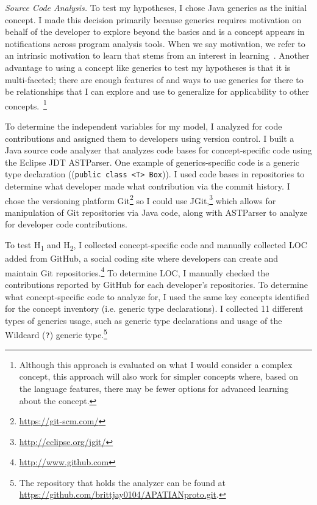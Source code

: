 \documentclass{llncs}
\begin{document}
\vspace{0.5em}
\noindent\textit{Source Code Analysis.}
To test my hypotheses, I chose Java generics as the initial concept. I made this decision primarily because generics requires motivation on behalf of the developer to explore beyond the basics and is a concept appears in notifications across program analysis tools. When we say motivation, we refer to an intrinsic motivation to learn that stems from an interest in learning~\cite{krapp1999interest,hall2008we}.		
Another advantage to using a concept like generics to test my hypotheses is that it is multi-faceted; there are enough features of and ways to use generics for there to be relationships that I can explore and use to generalize for applicability to other concepts.~\footnote{Although this approach is evaluated on what I would consider a complex concept, this approach will also work for simpler concepts where, based on the language features, there may be fewer options for advanced learning about the concept.}

To determine the independent variables for my model, I analyzed for code contributions and assigned them to developers using version control. 
I built a Java source code analyzer that analyzes code bases for concept-specific code using the Eclipse JDT ASTParser. 
One example of generics-specific code is a generic type declaration ((\texttt{public class <T> Box})).
I used code bases in repositories to determine what developer made what contribution via the commit history. 
I chose the versioning platform Git\footnote{\url{https://git-scm.com/}} so I could use JGit,\footnote{\url{http://eclipse.org/jgit/}} which allows for manipulation of Git repositories via Java code, along with ASTParser to analyze for developer code contributions.

To test H\textsubscript{1} and H\textsubscript{2}, I collected concept-specific code and manually collected LOC added from GitHub, a social coding site where developers can create and maintain Git repositories.\footnote{\url{http://www.github.com}} To determine LOC, I manually checked the contributions reported by GitHub for each developer's repositories. To determine what concept-specific code to analyze for, I used the same key concepts identified for the concept inventory (i.e. generic type declarations). I collected 11 different types of generics usage, such as generic type declarations and usage of the Wildcard (\texttt{?}) generic type.\footnote{The repository that holds the analyzer can be found at \url{https://github.com/brittjay0104/APATIANproto.git}.}
\end{document}
